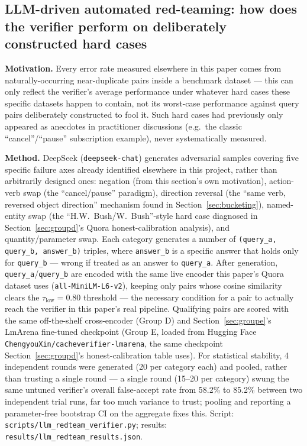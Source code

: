\documentclass[11pt]{article}
\newcommand{\taulow}{\ensuremath{\tau_{\text{low}}}}
\begin{document}
\subsection{LLM-driven automated red-teaming: how does the verifier perform on deliberately constructed hard cases}
\label{sec:redteam}

\textbf{Motivation.} Every error rate measured elsewhere in this paper comes from naturally-occurring near-duplicate pairs inside a benchmark dataset --- this can only reflect the verifier's average performance under whatever hard cases these specific datasets happen to contain, not its worst-case performance against query pairs deliberately constructed to fool it. Such hard cases had previously only appeared as anecdotes in practitioner discussions (e.g.\ the classic ``cancel''/``pause'' subscription example), never systematically measured.

\textbf{Method.} DeepSeek (\texttt{deepseek-chat}) generates adversarial samples covering five specific failure axes already identified elsewhere in this project, rather than arbitrarily designed ones: negation (from this section's own motivation), action-verb swap (the ``cancel/pause'' paradigm), direction reversal (the ``same verb, reversed object direction'' mechanism found in Section~\ref{sec:bucketing}), named-entity swap (the ``H.W.\ Bush/W.\ Bush''-style hard case diagnosed in Section~\ref{sec:groupd}'s Quora honest-calibration analysis), and quantity/parameter swap. Each category generates a number of \texttt{(query\_\allowbreak{}a, query\_\allowbreak{}b, answer\_\allowbreak{}b)} triples, where \texttt{answer\_\allowbreak{}b} is a specific answer that holds only for \texttt{query\_\allowbreak{}b} --- wrong if treated as an answer to \texttt{query\_\allowbreak{}a}. After generation, \texttt{query\_\allowbreak{}a}/\texttt{query\_\allowbreak{}b} are encoded with the same live encoder this paper's Quora dataset uses (\texttt{all-Mini\allowbreak{}LM-L6-v2}), keeping only pairs whose cosine similarity clears the $\taulow=0.80$ threshold --- the necessary condition for a pair to actually reach the verifier in this paper's real pipeline. Qualifying pairs are scored with the same off-the-shelf cross-encoder (Group D) and Section~\ref{sec:groupe}'s LmArena fine-tuned checkpoint (Group E, loaded from Hugging Face \texttt{Chengyou\allowbreak{}Xin/\allowbreak{}cacheverifier-lmarena}, the same checkpoint Section~\ref{sec:groupd}'s honest-calibration table uses). For statistical stability, 4 independent rounds were generated (20 per category each) and pooled, rather than trusting a single round --- a single round (15--20 per category) swung the same untuned verifier's overall false-accept rate from 58.2\% to 85.2\% between two independent trial runs, far too much variance to trust; pooling and reporting a parameter-free bootstrap CI on the aggregate fixes this. Script: \texttt{scripts/\allowbreak{}llm\_\allowbreak{}redteam\_\allowbreak{}verifier.\allowbreak{}py}; results: \texttt{results/\allowbreak{}llm\_\allowbreak{}redteam\_\allowbreak{}results.\allowbreak{}json}.
\end{document}
